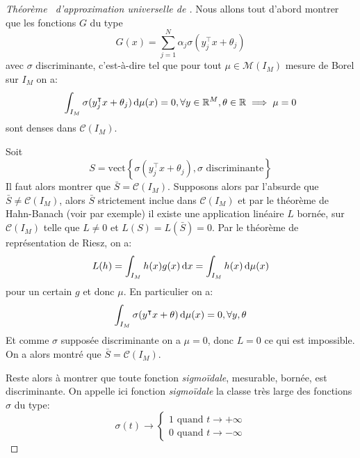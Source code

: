 \begin{proof}[Théorème~\label{cybenko} d'approximation universelle de \citet{Cybenko}]
    Nous allons tout d'abord montrer que les fonctions $G$ du type
    \begin{equation*}
        G(x) = \sum_{j=1}^N \alpha_j \sigma ( y^\intercal_j x + \theta_j )
    \end{equation*}
    avec $\sigma$ discriminante, c'est-à-dire tel que pour tout $\mu \in \mathcal{M} ( I_M)$ mesure de Borel sur $I_M$ on a:
    \begin{equation*}
        \int_{I_M} \sigma ( y^\intercal_j x + \theta_j ) \mathop{}\!\mathrm{d} \mu (x) = 0, \forall y \in \mathbb{R}^M, \theta \in \mathbb{R} \implies \mu = 0
    \end{equation*}
    sont denses dans $\mathcal{C} (I_M)$.
    
    Soit
    \begin{equation*}
        S = \mathrm{vect} \left\{ \sigma ( y^\intercal_j x + \theta_j ) , \sigma \text{ discriminante} \right\}
    \end{equation*}
    Il faut alors montrer que $\bar{S} = \mathcal{C} (I_M)$. Supposons alors par l'absurde que $\bar{S} \neq \mathcal{C} (I_M)$, alors $\bar{S}$ strictement inclue dans $\mathcal{C} (I_M)$ et par le théorème de Hahn-Banach (voir \citet{Brezis2011} par exemple) il existe une application linéaire $L$ bornée, sur $\mathcal{C} (I_M)$ telle que $L \neq 0$ et $L(S) = L(\bar{S}) = 0$.
    Par le théorème de représentation de Riesz, on a:
    \begin{equation*}
        L(h) = \int_{I_M} h(x) g(x) \mathop{}\!\mathrm{d} x = \int_{I_M} h(x) \mathop{}\!\mathrm{d} \mu(x) 
    \end{equation*}
    pour un certain $g$ et donc $\mu$.
    En particulier on a:
    \begin{equation*}
        \int_{I_M} \sigma (y^\intercal x + \theta) \mathop{}\!\mathrm{d} \mu(x) = 0 , \forall y,\theta
    \end{equation*}
    Et comme $\sigma$ supposée discriminante on a $\mu = 0$, donc $L = 0$ ce qui est impossible. 
    On a alors montré que $\bar{S} = \mathcal{C} (I_M)$.
    
    Reste alors à montrer que toute fonction \emph{sigmoïdale}, mesurable, bornée, est discriminante.
    On appelle ici fonction \emph{sigmoïdale} la classe très large des fonctions $\sigma$ du type:
    \begin{equation*}
    \sigma(t) \to \begin{cases}
        1 \text{ quand } t \to +\infty \\
        0 \text{ quand } t \to -\infty
    \end{cases}
    \end{equation*}
    

\end{proof}
